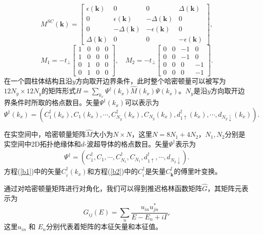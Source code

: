 \begin{equation}
M^{SC}(\mathbf{k})=
\left[
\begin{array}{cccc}
\epsilon({\mathbf{k}}) & 0 & 0 & \Delta(\mathbf{k}) \\
0 & \epsilon({\mathbf{k}}) & -\Delta(\mathbf{k}) & 0 \\
0 & -\Delta(\mathbf{k}) & -\epsilon({\mathbf{k}}) & 0 \\
\Delta(\mathbf{k}) & 0 & 0 & -\epsilon({\mathbf{k}})
\end{array}
\right],
\end{equation}
\begin{equation}
M_1=-t_{\perp}\left[
\begin{array}{cccc}
1 & 0 & 0 & 0 \\
1 & 0 & 0 & 0 \\
0 & 1 & 0 & 0 \\
0 & 1 & 0 & 0
\end{array}
\right],\quad
M_2=-t_{\perp}\left[
\begin{array}{cccc}
0 & 0 & -1 & 0 \\
0 & 0 & -1 & 0 \\
0 & 0 & 0 & -1 \\
0 & 0 & 0 & -1
\end{array}
\right].
\end{equation}
在一个圆柱体结构且沿$y$方向取开边界条件，此时整个哈密顿量可以被写为$12N_y\times 12N_y$的矩阵形式$H=\sum_{k_x}\Psi^\dagger(k_x)\hat{M}(k_x)\Psi(k_x)$。$N_y$是沿$y$方向取开边界条件时所取的格点数目。矢量$\Psi^\dagger(k_x)$可以表示为
\begin{equation}
\Psi^\dagger(k_{x}) =(C^\dagger_1(k_x),C_{1}(k_x),\cdots,C^\dagger_{N_y}(k_x),C_{N_y}(k_x),d^\dagger_{1\uparrow}(k_x),\cdots,d_{N_y\downarrow}(k_x)).\label{b1}
\end{equation}

 在实空间中，哈密顿量矩阵$\hat{M}$大小为$N\times N$，这里$N=8N_1+4N_2$，$N_1,N_2$分别是实空间中2D拓扑绝缘体和$d$-波超导体的格点数目。矢量$\Psi^\dagger$表示为
\begin{eqnarray}
\Psi^\dagger =(C^\dagger_1,C_{1},\cdots,C^\dagger_{N_1},C_{N_1},d^\dagger_{1\uparrow},\cdots,d_{N_2\downarrow}).\label{b2}
\end{eqnarray}
方程(\ref{b1})中的矢量$C^\dagger_i(k_x)$和方程(\ref{b2})中的$C^\dagger_i$是矢量$C^\dagger_\mathbf{k}$的傅里叶变换。

 通过对哈密顿量矩阵进行对角化，我们可以得到推迟格林函数矩阵$\hat{G}$，其矩阵元表示为
\begin{equation}
G_{ij}(E)=\sum_n\frac{u_{in}u^{*}_{jn}}{E-E_n+i\Gamma}.
\end{equation}
这里$u_{in}$ 和 $E_n$分别代表着矩阵的本征矢量和本征值。

